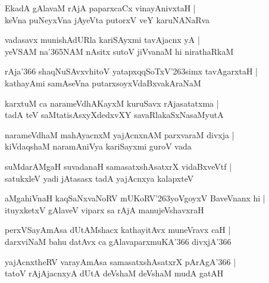 \begin{shloka}
EkadA gAlavaM rAjA paparxcaCx vinayAnivxtaH |\\
keVna puNeyxVna jAyeVta putorxV veY karuNANaRva
\end{shloka}

\begin{shloka}
vadasavx munishAdURla kariSAyxmi tavAjacnx yA |\\
yeVSAM na\char'365NAM nAsitx sutoV jiVvanaM hi nirathaRkaM
\end{shloka}

\begin{shloka}
rAja\char'366 shaqNuSAvxvhitoV yatapxqqSoTxV\char'263simx tavAgarxtaH |\\
kathayAmi samAseVna putarxsoyxVdaBxvakAraNaM
\end{shloka}

\begin{shloka}
karxtuM ca narameVdhAKayxM kuruSavx rAjasatatxma |\\
tadA teV saMtatisAsxyXdedxvXY savaRlakaSxNasaMyutA
\end{shloka}

\begin{shloka}
narameVdhaM mahAyacnxM yajAcnxnAM parxvaraM divxja |\\
kiVdaqshaM naramAniVya kariSayxmi guroV vada
\end{shloka}

\begin{shloka}
suMdarAMgaH suvadanaH samasatxshAsatxrX vidaBxveVtf |\\
satukxleV yadi jAtasasx tadA yajAcnxya kalapxteV
\end{shloka}

\begin{shloka}
aMgahiVnaH kaqSaNxvaNoRV mUKoRV\char'263yoVgoyxV BaveVnanx hi |\\
ituyxketxV gAlaveV viparx sa rAjA manujeVshavxraH
\end{shloka}

\begin{shloka}
perxVSayAmAsa dUtAMshacx kathayitAvx muneVravx caH |\\
darxviNaM bahu datAvx ca gAlavaparxmuKA\char'366 divxjA\char'366
\end{shloka}

\begin{shloka}
yajAcnxtheRV varayAmAsa samasatxshAsatxrX pArAgA\char'366 |\\
tatoV rAjAjacnxyA dUtA deVshaM deVshaM mudA gatAH
\end{shloka}

